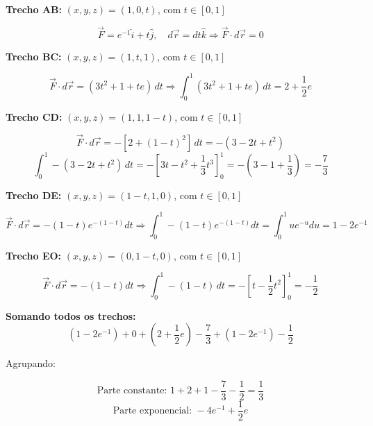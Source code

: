 \documentclass[a4paper,12pt]{article}
\begin{document}
\begin{flushleft}
\textbf{Trecho AB:} $(x,y,z) = (1,0,t)$, com $t \in [0,1]$

\begin{equation}
\vec{F} = e^{-1} \hat{i} + t \hat{j}, \quad d\vec{r} = dt \hat{k}
\Rightarrow \vec{F} \cdot d\vec{r} = 0
\end{equation}

\textbf{Trecho BC:} $(x,y,z) = (1,t,1)$, com $t \in [0,1]$

\begin{equation}
\vec{F} \cdot d\vec{r} = (3t^2 + 1 + t e)\,dt \Rightarrow \int_0^1 (3t^2 + 1 + t e)\,dt = 2 + \frac{1}{2}e
\end{equation}

\textbf{Trecho CD:} $(x,y,z) = (1,1,1 - t)$, com $t \in [0,1]$

\begin{equation}
\vec{F} \cdot d\vec{r} = -[2 + (1 - t)^2]\,dt = -(3 - 2t + t^2)
\end{equation}
\begin{equation}
\int_0^1 -(3 - 2t + t^2)\,dt = -\left[3t - t^2 + \frac{1}{3}t^3\right]_0^1 = -\left(3 - 1 + \frac{1}{3}\right) = -\frac{7}{3}
\end{equation}

\textbf{Trecho DE:} $(x,y,z) = (1 - t, 1, 0)$, com $t \in [0,1]$

\begin{equation}
\vec{F} \cdot d\vec{r} = -(1 - t) e^{-(1 - t)} dt
\Rightarrow \int_0^1 -(1 - t)e^{-(1 - t)} dt = \int_0^1 u e^{-u} du = 1 - 2e^{-1}
\end{equation}

\textbf{Trecho EO:} $(x,y,z) = (0,1 - t, 0)$, com $t \in [0,1]$

\begin{equation}
\vec{F} \cdot d\vec{r} = - (1 - t) dt \Rightarrow \int_0^1 -(1 - t)\,dt = -\left[ t - \frac{1}{2}t^2 \right]_0^1 = -\frac{1}{2}
\end{equation}

\textbf{Somando todos os trechos:}
\begin{equation}
(1 - 2e^{-1}) + 0 + \left(2 + \frac{1}{2}e\right) - \frac{7}{3} + (1 - 2e^{-1}) - \frac{1}{2}
\end{equation}

Agrupando:

\begin{equation}
\text{Parte constante: } 1 + 2 + 1 - \frac{7}{3} - \frac{1}{2} = \frac{1}{3}
\end{equation}
\begin{equation}
\text{Parte exponencial: } -4e^{-1} + \frac{1}{2}e
\end{equation}


\end{flushleft}
\end{document}
